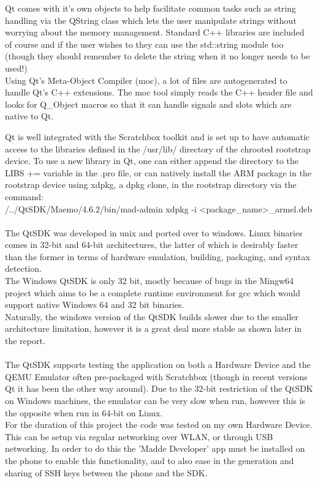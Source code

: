 Qt comes with it's own objects to help facilitate common tasks such as string handling via the QString class which lets the user manipulate strings without worrying about the memory management. Standard C++ libraries are included of course and if the user wishes to they can use the std::string module too (though they should remember to delete the string when it no longer needs to be used!)
\\Using Qt's Meta-Object Compiler (moc), a lot of files are autogenerated to handle Qt's C++ extensions. The moc tool simply reads the C++ header file and looks for Q\_Object macros so that it can handle signals and slots which are native to Qt.

Qt is well integrated with the Scratchbox toolkit and is set up to have automatic access to the libraries defined in the /usr/lib/ directory of the chrooted rootstrap device. To use a new library in Qt, one can either append the directory to the LIBS += variable in the .pro file, or can natively install the ARM package in the rootstrap device using xdpkg, a dpkg clone, in the rootstrap directory via the command:\\
/../QtSDK/Maemo/4.6.2/bin/mad-admin xdpkg -i <package\_name>\_armel.deb\\

\hspace{-20pt}{\bf Ubuntu vs Windows}\\
The QtSDK was developed in unix and ported over to windows. Linux binaries comes in 32-bit and 64-bit architectures, the latter of which is desirably faster than the former in terms of hardware emulation, building, packaging, and syntax detection.\\The Windows QtSDK is only 32 bit, mostly because of bugs in the Mingw64 project which aims to be a complete runtime environment for gcc which would support native Windows 64 and 32 bit binaries.\\
Naturally, the windows version of the QtSDK builds slower due to the smaller architecture limitation, however it is a great deal more stable as shown later in the report.\\

\hspace{-20pt}{\bf Hardware Device, Emulator}\\
The QtSDK supports testing the application on both a Hardware Device and the QEMU Emulator often pre-packaged with Scratchbox (though in recent versions Qt it has been the other way around). Due to the 32-bit restriction of the QtSDK on Windows machines, the emulator can be very slow when run, however this is the opposite when run in 64-bit on Linux.\\
For the duration of this project the code was tested on my own Hardware Device. This can be setup via regular networking over WLAN, or through USB networking. In order to do this the 'Madde Developer' app must be installed on the phone to enable this functionality, and to also ease in the generation and sharing of SSH keys between the phone and the SDK.

